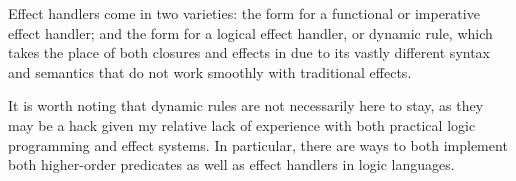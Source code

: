 Effect handlers come in two varieties: the  form for a functional
or imperative effect handler; and the  form for a logical effect
handler, or dynamic rule, which takes the place of both closures and effects
in \Law{} due to its vastly different syntax and semantics that do not work
smoothly with traditional effects.

It is worth noting that dynamic rules are not necessarily here to stay, as
they may be a hack given my relative lack of experience with both practical
logic programming and effect systems. In particular, there are ways to both
implement both higher-order predicates\cite{hologic} as well as effect
handlers in logic languages\cite{prologeffects}.
